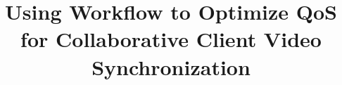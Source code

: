 \documentclass{sig-alternate}
\begin{document}
%


\title{Using Workflow to Optimize QoS for Collaborative Client Video
Synchronization}
%
%

%
\end{document}
